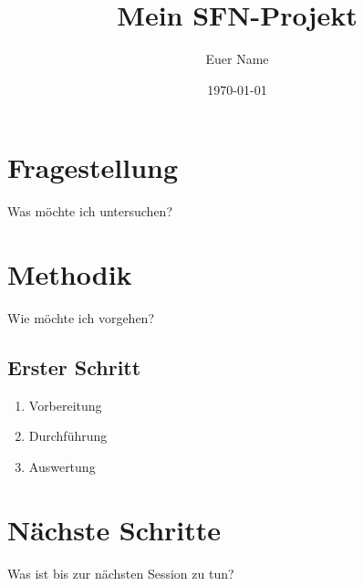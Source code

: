 \documentclass[a4paper,11pt]{article}
\title{Mein SFN-Projekt}
\author{Euer Name}
\date{\today}
\begin{document}
\maketitle
\tableofcontents
\newpage

\section{Fragestellung}
Was möchte ich untersuchen?

\section{Methodik}
Wie möchte ich vorgehen?

\subsection{Erster Schritt}
\begin{enumerate}
  \item Vorbereitung
  \item Durchführung
  \item Auswertung
\end{enumerate}

\section{Nächste Schritte}
Was ist bis zur nächsten Session zu tun?
\end{document}
